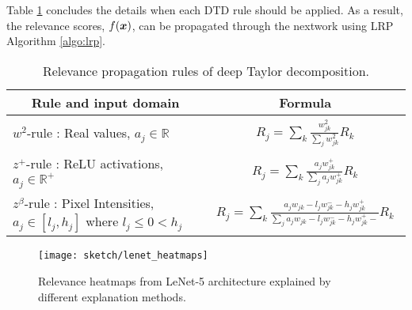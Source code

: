 Table \ref{tab:lrp_deep_taylor_rules} concludes the details  when each DTD rule should be applied. As a result, the relevance scores, $f(\boldsymbol{x})$, can be propagated through the nextwork using LRP Algorithm \ref{algo:lrp}.


\renewcommand{\arraystretch}{1}
\begin{table}[h]
\centering
\begin{tabular}{|l|l|}
\hline
\multicolumn{1}{|c|}{Rule and input domain} & \multicolumn{1}{c|}{Formula} \\ \hline
$w^2$-rule : Real values,  $a_j \in \mathbb{R}$ & \parbox{1cm}{
	\begin{align*}
		R_j =	\sum_k \frac{ w_{jk}^2  }{\sum_{j} w_{jk}^2}  R_k  	
    \end{align*}}
 \\ \hline
$z^+$-rule : ReLU activations, $a_j \in \mathbb{R}^+$    & \parbox{1cm}{\begin{align*}
R_j = \sum_k  \frac{ a_j  w_{jk}^+   }{\sum_{j}  a_j w_{jk}^+  }  R_k	
\end{align*}} \\ \hline
$z^\beta$-rule : Pixel Intensities, $ a_j \in [l_j , h_j]$ where $l_j \le 0 < h_j $  & \parbox{1cm}{\begin{align*}
R_j = \sum_k  \frac{ a_j  w_{jk} - l_j w_{jk}^- - h_j w_{jk}^+  }{\sum_{j}   a_j  w_{jk} - l_j w_{jk}^- - h_j w_{jk}^+  -}  R_k	
\end{align*}}
               \\ \hline
\end{tabular}
\caption{Relevance propagation rules of deep Taylor decomposition. }
\label{tab:lrp_deep_taylor_rules}
\end{table}
\renewcommand{\arraystretch}{1}


\begin{figure}[!htb]
\centering
\texttt{[image: sketch/lenet\_heatmaps]}
\caption[xx]{Relevance heatmaps from LeNet-5 architecture explained by different explanation methods. \heatmapscaleexplain }
\label{fig:lenet_heatmaps}
\end{figure}

